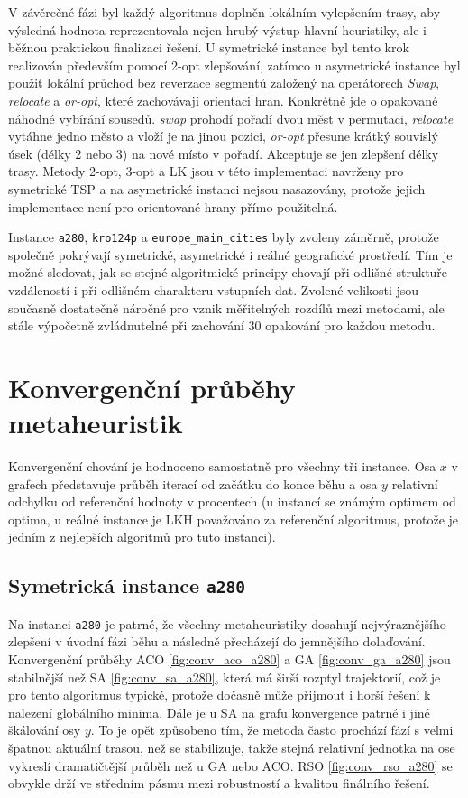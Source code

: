 V závěrečné fázi byl každý algoritmus doplněn lokálním vylepšením trasy, aby výsledná hodnota reprezentovala nejen hrubý výstup hlavní heuristiky, ale i běžnou praktickou finalizaci řešení. U symetrické instance byl tento krok realizován především pomocí 2-opt zlepšování, zatímco u asymetrické instance byl použit lokální průchod bez reverzace segmentů založený na operátorech \emph{Swap}, \emph{relocate} a \emph{or-opt}, které zachovávají orientaci hran. Konkrétně jde o opakované náhodné vybírání sousedů. \emph{swap} prohodí pořadí dvou měst v permutaci, \emph{relocate} vytáhne jedno město a vloží je na jinou pozici, \emph{or-opt} přesune krátký souvislý úsek (délky 2 nebo 3) na nové místo v pořadí. Akceptuje se jen zlepšení délky trasy. Metody 2-opt, 3-opt a LK jsou v této implementaci navrženy pro symetrické TSP a na asymetrické instanci nejsou nasazovány, protože jejich implementace není pro orientované hrany přímo použitelná.

Instance \texttt{a280}, \texttt{kro124p} a \texttt{europe\_main\_cities} byly zvoleny záměrně, protože společně pokrývají symetrické, asymetrické i reálné geografické prostředí. Tím je možné sledovat, jak se stejné algoritmické principy chovají při odlišné struktuře vzdáleností i při odlišném charakteru vstupních dat. Zvolené velikosti jsou současně dostatečně náročné pro vznik měřitelných rozdílů mezi metodami, ale stále výpočetně zvládnutelné při zachování 30 opakování pro každou metodu.

\section{Konvergenční průběhy metaheuristik}
\label{sec:exp_convergence}
Konvergenční chování je hodnoceno samostatně pro všechny tři instance. Osa \(x\) v grafech představuje průběh iterací od začátku do konce běhu a osa \(y\) relativní odchylku od referenční hodnoty v procentech (u instancí se známým optimem od optima, u reálné instance je LKH považováno za referenční algoritmus, protože je jedním z nejlepších algoritmů pro tuto instanci).

\subsection{Symetrická instance \texttt{a280}}
Na instanci \texttt{a280} je patrné, že všechny metaheuristiky dosahují nejvýraznějšího zlepšení v úvodní fázi běhu a následně přecházejí do jemnějšího dolaďování. Konvergenční průběhy ACO \ref{fig:conv_aco_a280} a GA \ref{fig:conv_ga_a280} jsou stabilnější než SA \ref{fig:conv_sa_a280}, která má širší rozptyl trajektorií, což je pro tento algoritmus typické, protože dočasně může přijmout i horší řešení k nalezení globálního minima. Dále je u SA na grafu konvergence patrné i jiné škálování osy $y$. To je opět způsobeno tím, že metoda často prochází fází s velmi špatnou aktuální trasou, než se stabilizuje, takže stejná relativní jednotka na ose vykreslí dramatičtější průběh než u GA nebo ACO. RSO \ref{fig:conv_rso_a280} se obvykle drží ve středním pásmu mezi robustností a kvalitou finálního řešení. 

